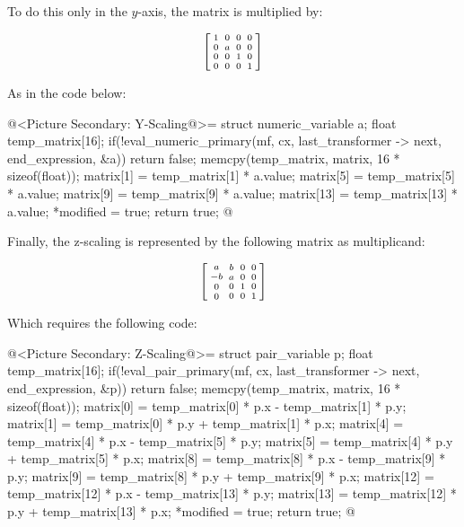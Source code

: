To do this only in the $y$-axis, the matrix is multiplied by:

$$\left[{{1 \atop 0}\atop {0\atop
      0}}{{0 \atop a}\atop {0 \atop 0}}{{0\atop 0}\atop{1 \atop
      0}}{{0 \atop 0}\atop{0\atop 1}}\right]
$$

As in the code below:

\iniciocodigo
@<Picture Secondary: Y-Scaling@>=
struct numeric_variable a;
float temp_matrix[16];
if(!eval_numeric_primary(mf, cx, last_transformer -> next, end_expression, &a))
  return false;
memcpy(temp_matrix, matrix, 16 * sizeof(float));
matrix[1] = temp_matrix[1] * a.value;
matrix[5] = temp_matrix[5] * a.value;
matrix[9] = temp_matrix[9] * a.value;
matrix[13] = temp_matrix[13] * a.value;
*modified = true;
return true;
@
\fimcodigo

Finally, the z-scaling is represented by the following matrix as
multiplicand:

$$\left[{{a \atop -b}\atop {0\atop
      0}}{{b \atop a}\atop {0 \atop 0}}{{0\atop 0}\atop{1 \atop
      0}}{{0 \atop 0}\atop{0\atop 1}}\right]
$$

Which requires the following code:

\iniciocodigo
@<Picture Secondary: Z-Scaling@>=
struct pair_variable p;
float temp_matrix[16];
if(!eval_pair_primary(mf, cx, last_transformer -> next, end_expression, &p))
  return false;
memcpy(temp_matrix, matrix, 16 * sizeof(float));
matrix[0] = temp_matrix[0] * p.x - temp_matrix[1] * p.y;
matrix[1] = temp_matrix[0] * p.y + temp_matrix[1] * p.x;
matrix[4] = temp_matrix[4] * p.x - temp_matrix[5] * p.y;
matrix[5] = temp_matrix[4] * p.y + temp_matrix[5] * p.x;
matrix[8] = temp_matrix[8] * p.x - temp_matrix[9] * p.y;
matrix[9] = temp_matrix[8] * p.y + temp_matrix[9] * p.x;
matrix[12] = temp_matrix[12] * p.x - temp_matrix[13] * p.y;
matrix[13] = temp_matrix[12] * p.y + temp_matrix[13] * p.x;
*modified = true;
return true;
@
\fimcodigo









\fim
